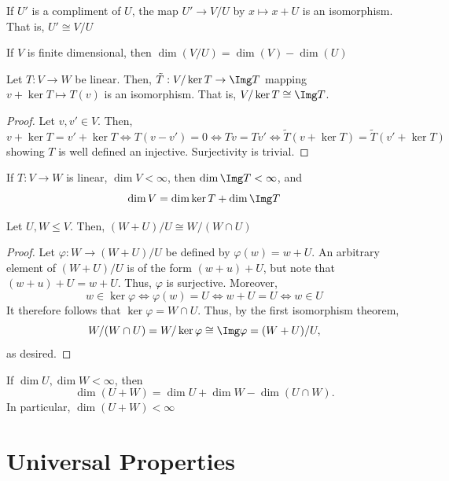 \begin{prop}
    If $U'$ is a compliment of $U$, the map $U'\to V/U$ by $x \mapsto x+U$ is an isomorphism. That is, $U' \cong V/U$
\end{prop}

\begin{cor}
    If $V$ is finite dimensional, then $\dim(V/U) = \dim (V) - \dim (U)$
\end{cor}

\begin{thm}
    Let $T:V \to W$ be linear. Then, $\tilde T:V/\ker T \to \Img T$ mapping $v+\ker T \mapsto T(v)$ is an isomorphism. That is, $V/\ker T \cong \Img T$.
\end{thm}

\begin{proof}
    Let $v,v' \in V$. Then,
    $$v + \ker T =v' + \ker T  \iff T(v-v')=0 \iff Tv=Tv' \iff \tilde T(v+\ker T)=\tilde T(v'+\ker T)$$
    showing $T$ is well defined an injective. Surjectivity is trivial.
\end{proof}

\begin{cor}
    If $T:V \to W$ is linear, $\dim V < \infty$, then $\dim \Img T < \infty$, and
    $$\dim V = \dim \ker T + \dim \Img T$$
\end{cor}

\begin{thm}
    Let $U,W \leq V$. Then, $(W+U)/U\cong W/(W \cap U)$
\end{thm}

\begin{proof}
    Let $\varphi : W \to (W+U)/U$ be defined by $\varphi (w) = w+U$. An arbitrary element of $(W+U)/U$ is of the form $(w+u)+U$, but note that $(w+u)+U=w+U$. Thus, $\varphi$ is surjective. Moreover,
    $$w \in \ker \varphi \iff \varphi (w) = U \iff w+U=U \iff w \in U$$
    It therefore follows that $\ker \varphi = W \cap U$. Thus, by the first isomorphism theorem,
    $$W/(W \cap U)=W/\ker \varphi  \cong \Img \varphi= (W+U)/U,$$
    as desired.
\end{proof}

\begin{cor}
    If $\dim U,\dim W<\infty$, then
    $$\dim(U+W) = \dim U + \dim W - \dim (U \cap W).$$
    In particular, $\dim(U+W) < \infty$
\end{cor}

\section{Universal Properties}

